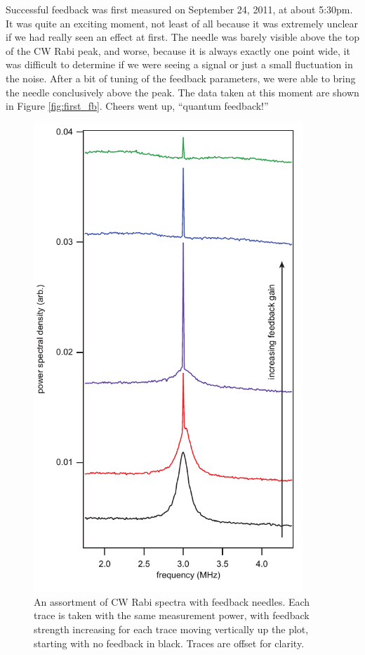 Successful feedback was first measured on September 24, 2011, at about 5:30pm.  It was quite an exciting moment, not least of all because it was extremely unclear if we had really seen an effect at first.  The needle was barely visible above the top of the CW Rabi peak, and worse, because it is always exactly one point wide, it was difficult to determine if we were seeing a signal or just a small fluctuation in the noise.  After a bit of tuning of the feedback parameters, we were able to bring the needle conclusively above the peak.  The data taken at this moment are shown in Figure \ref{fig:first_fb}.  Cheers went up, ``quantum feedback!''

\begin{figure}
\begin{center}
	\includegraphics[width = 4in]{qfb_results_chapter/needle_zoo}
\end{center}
\caption[CW Rabi spectrum and needles versus feedback strength]{An assortment of CW Rabi spectra with feedback needles.  Each trace is taken with the same measurement power, with feedback strength increasing for each trace moving vertically up the plot, starting with no feedback in black.  Traces are offset for clarity.}
\label{fig:needle_zoo}
\end{figure}

